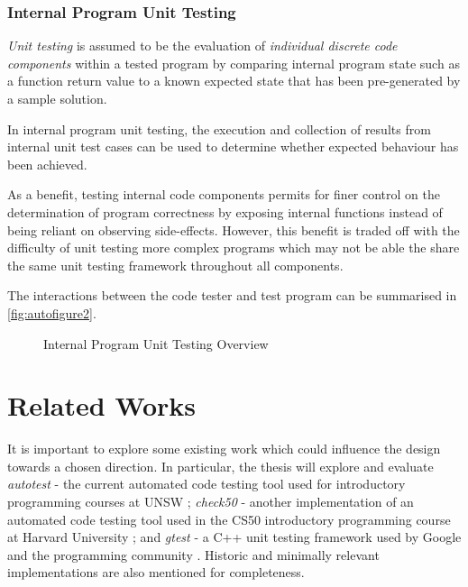 \documentclass[hidelinks]{report}
\newcommand{\unchapter}[2]{
    \setcounter{chapter}{#1}
    \setcounter{section}{0}
    \chapter*{#2}
    \addcontentsline{toc}{chapter}{#2}
}
\begin{document}
\subsection{Internal Program Unit Testing}

\textit{Unit testing} is assumed to be the evaluation of \textit{individual discrete code components} within a tested program by comparing internal program state such as a function return value to a known expected state that has been pre-generated by a sample solution.

In internal program unit testing, the execution and collection of results from internal unit test cases can be used to determine whether expected behaviour has been achieved.

As a benefit, testing internal code components permits for finer control on the determination of program correctness by exposing internal functions instead of being reliant on observing side-effects. However, this benefit is traded off with the difficulty of unit testing more complex programs which may not be able the share the same unit testing framework throughout all components.

The interactions between the code tester and test program can be summarised in \autoref{fig:autofigure2}.

\begin{figure}[h]
	\centering
	\caption{Internal Program Unit Testing Overview}
	\label{fig:autofigure2}
\end{figure}

\unchapter{3}{Related Works}

It is important to explore some existing work which could influence the design towards a chosen direction. In particular, the thesis will explore and evaluate \textit{autotest} - the current automated code testing tool used for introductory programming courses at UNSW \cite{Autotest}; \textit{check50} - another implementation of an automated code testing tool used in the CS50 introductory programming course at Harvard University \cite{check50}; and \textit{gtest} - a C++ unit testing framework used by Google and the programming community \cite{gtest}. Historic and minimally relevant implementations are also mentioned for completeness. 
\end{document}
